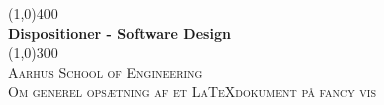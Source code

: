 
\newcommand{\myTitle}{Dispositioner - Software Design}


\begin{titlepage}
	
	\begin{center}
		\line(1,0){400} \\
		[0.5cm]
		\huge{\bfseries \myTitle} \\
		[0cm]
		\line(1,0){300} \\
		[1.5cm]
		\textsc{\LARGE Aarhus School of Engineering} \\
		[0.1cm]
		\textsc{\large Om generel opsætning af et \LaTeX dokument på fancy vis} \\
		[10cm]
	\end{center}
	
	
\end{titlepage}